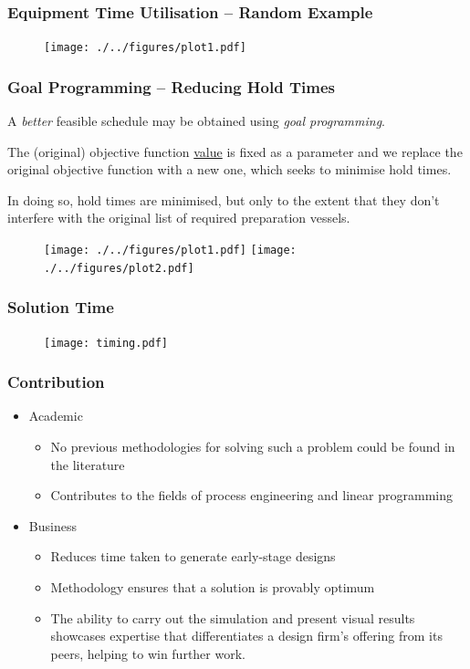 \documentclass{beamer}
\begin{document}
\begin{frame}
    \frametitle{Equipment Time Utilisation -- Random Example}
    \begin{figure}
        \centering
        \texttt{[image: ./../figures/plot1.pdf]}
    \end{figure}
\end{frame}

\begin{frame}
    \frametitle{Goal Programming -- Reducing Hold Times}
    A \emph{better} feasible schedule may be obtained using \emph{goal
    programming}.
    
    The (original) objective function \underline{value} is fixed as a parameter
    and we replace the original objective function with a new one, which seeks to 
    minimise hold times.
    
    In doing so, hold times are minimised, but only to the extent that they
    don't interfere with the original list of required preparation vessels.
    \begin{figure}
        \centering
        \texttt{[image: ./../figures/plot1.pdf]}
        \texttt{[image: ./../figures/plot2.pdf]}
    \end{figure}
\end{frame}

\begin{frame}
    \frametitle{Solution Time}
    \begin{figure}
        \centering
        \texttt{[image: timing.pdf]}
    \end{figure}
\end{frame}

\begin{frame}
    \frametitle{Contribution}
    \begin{itemize}
        \item Academic
        \begin{itemize}
            \item No previous methodologies for solving such a problem could be
            found in the literature
            \item Contributes to the fields of process engineering and 
            linear programming
        \end{itemize}
        \vspace{1cm}
        \item Business
        \begin{itemize}
            \item Reduces time taken to generate early-stage designs
            \item Methodology ensures that a solution is provably optimum
            \item The ability to carry out the simulation and present visual
                results showcases expertise that differentiates a design firm's
                offering from its peers, helping to win further work.
        \end{itemize}
    \end{itemize}
\end{frame}
\end{document}
